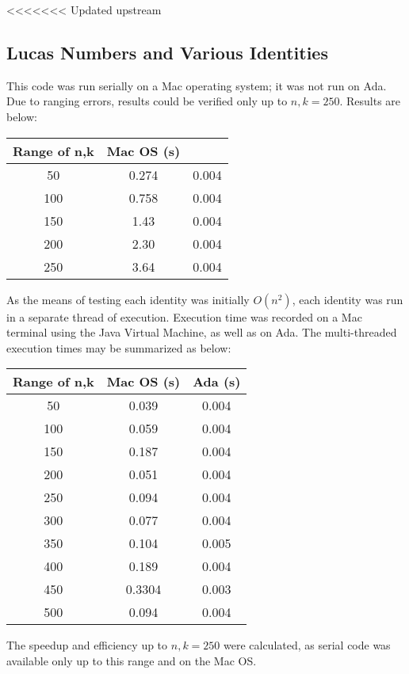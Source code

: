 \documentclass[11pt]{article}
\begin{document}
<<<<<<< Updated upstream
\subsection{Lucas Numbers and Various Identities}
This code was run serially on a Mac operating system; it was not run on Ada. Due to ranging errors, results could be verified only up to $n,k=250$. Results are below:
\begin{tabular}{ccc}
\hline
 Range of n,k & Mac OS (s)  \\ \hline
50 & 0.274 & 0.004\\
100 & 0.758 & 0.004 \\
150 & 1.43 & 0.004 \\
200 & 2.30 & 0.004 \\
250 & 3.64 & 0.004 \\ 
\hline \hline
\end{tabular}
As the means of testing each identity was initially $O(n^{2})$, each identity was run in a separate thread of execution. Execution time was recorded on a Mac terminal using the Java Virtual Machine, as well as on Ada. The multi-threaded execution times may be summarized as below:\\
\begin{tabular}{ccc}
\hline
 Range of n,k & Mac OS (s) & Ada (s) \\ \hline
50 & 0.039 & 0.004\\
100 & 0.059 & 0.004 \\
150 & 0.187 & 0.004 \\
200 & 0.051 & 0.004 \\
250 & 0.094 & 0.004 \\ 
300 & 0.077 & 0.004 \\
350 & 0.104 & 0.005 \\
400 & 0.189 & 0.004 \\
450 & 0.3304 & 0.003 \\
500 & 0.094 &0.004 \\ \hline \hline
\end{tabular}

The speedup and efficiency up to $n,k=250$ were calculated, as serial code was available only up to this range and on the Mac OS.
\end{document}
